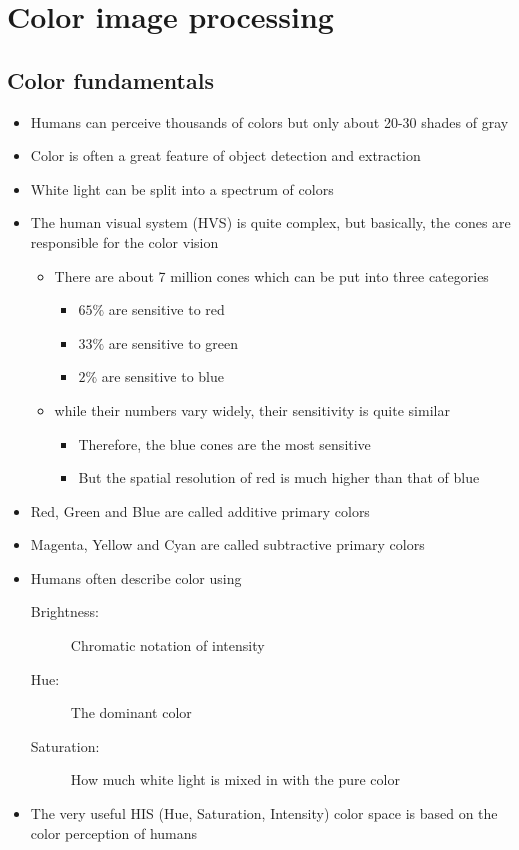 \section{Color image processing }
\subsection{Color fundamentals }
\begin{itemize}
	\item Humans can perceive thousands of colors but only about 20-30 shades of gray
	\item Color is often a great feature of object detection and extraction
	\item White light can be split into a spectrum of colors
	\item The human visual system (HVS) is quite complex, but basically, the cones are responsible for the color vision
	\begin{itemize}
		\item There are about 7 million cones which can be put into three categories
		\begin{itemize}
			\item $65\% $ are sensitive to red
			\item $33\% $ are sensitive to green
			\item $2\% $ are sensitive to blue
		\end{itemize}
		\item while their numbers vary widely, their sensitivity is quite similar
		\begin{itemize}
			\item Therefore, the blue cones are the most sensitive
			\item But the spatial resolution of red is much higher than that of blue
		\end{itemize}
	\end{itemize}
	\item Red, Green and Blue are called additive primary colors
	\item Magenta, Yellow and Cyan are called subtractive primary colors
	\item Humans often describe color using
	\begin{description}
		\item[Brightness:] Chromatic notation of intensity
		\item[Hue:] The dominant color
		\item[Saturation:] How much white light is mixed in with the pure color
	\end{description}
	\item The very useful HIS (Hue, Saturation, Intensity) color space is based on the color perception of humans	
\end{itemize}


